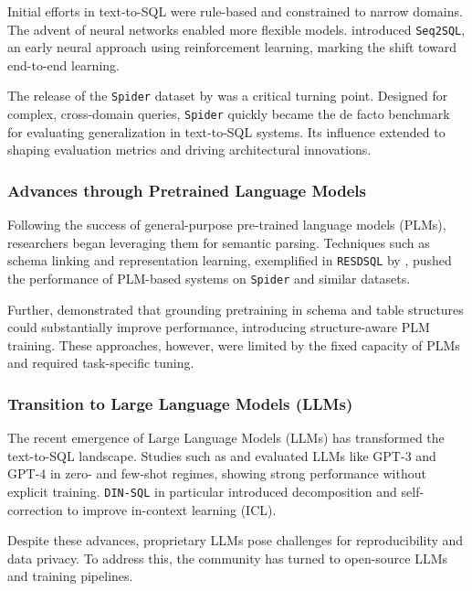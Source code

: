 Initial efforts in text-to-SQL were rule-based and constrained to narrow domains. The advent of neural networks enabled more flexible models. \citet{zhong2017seq2sql} introduced \texttt{Seq2SQL}, an early neural approach using reinforcement learning, marking the shift toward end-to-end learning.

The release of the \texttt{Spider} dataset by \citet{yu2018spider} was a critical turning point. Designed for complex, cross-domain queries, \texttt{Spider} quickly became the de facto benchmark for evaluating generalization in text-to-SQL systems. Its influence extended to shaping evaluation metrics and driving architectural innovations.

\subsubsection{Advances through Pretrained Language Models}

Following the success of general-purpose pre-trained language models (PLMs), researchers began leveraging them for semantic parsing. Techniques such as schema linking and representation learning, exemplified in \texttt{RESDSQL} by \citet{li2023resdsql}, pushed the performance of PLM-based systems on \texttt{Spider} and similar datasets.

Further, \citet{deng2021structure} demonstrated that grounding pretraining in schema and table structures could substantially improve performance, introducing structure-aware PLM training. These approaches, however, were limited by the fixed capacity of PLMs and required task-specific tuning.

\subsubsection{Transition to Large Language Models (LLMs)}

The recent emergence of Large Language Models (LLMs) has transformed the text-to-SQL landscape. Studies such as \citet{rajkumar2022evaluating} and \citet{pourreza2023dinsql} evaluated LLMs like GPT-3 and GPT-4 in zero- and few-shot regimes, showing strong performance without explicit training. \texttt{DIN-SQL} in particular introduced decomposition and self-correction to improve in-context learning (ICL).

Despite these advances, proprietary LLMs pose challenges for reproducibility and data privacy. To address this, the community has turned to open-source LLMs and training pipelines.

